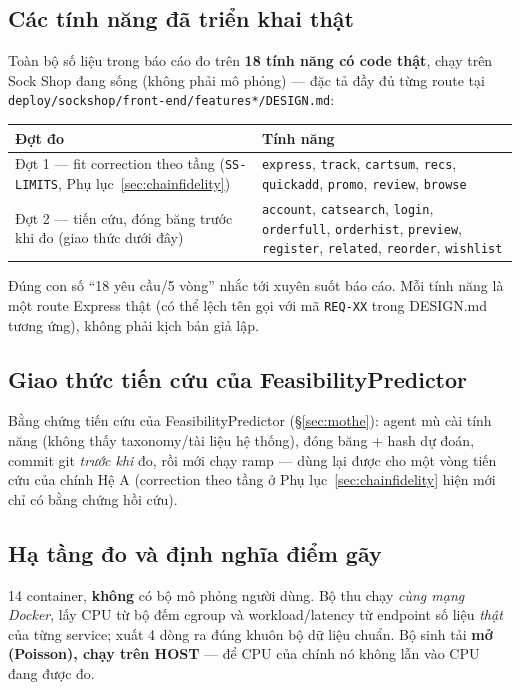 \documentclass[11pt,a4paper]{article}
\begin{document}
\subsection*{Các tính năng đã triển khai thật}\label{sec:tinhnangdatrienkhai}
Toàn bộ số liệu trong báo cáo đo trên \textbf{18 tính năng có code thật}, chạy
trên Sock Shop đang sống (không phải mô phỏng) --- đặc tả đầy đủ từng route tại
\texttt{deploy/sockshop/front-end/features*/DESIGN.md}:
\begin{center}\small
\begin{tabular}{p{7.6cm}p{5.4cm}}
\toprule Đợt đo & Tính năng \\ \midrule
Đợt 1 --- fit correction theo tầng (\texttt{SS-LIMITS}, Phụ lục~\ref{sec:chainfidelity}) &
  \texttt{express}, \texttt{track}, \texttt{cartsum}, \texttt{recs},
  \texttt{quickadd}, \texttt{promo}, \texttt{review}, \texttt{browse} \\
Đợt 2 --- tiến cứu, đóng băng trước khi đo (giao thức dưới đây) &
  \texttt{account}, \texttt{catsearch}, \texttt{login}, \texttt{orderfull},
  \texttt{orderhist}, \texttt{preview}, \texttt{register}, \texttt{related},
  \texttt{reorder}, \texttt{wishlist} \\ \bottomrule
\end{tabular}\end{center}
Đúng con số ``18 yêu cầu/5 vòng'' nhắc tới xuyên suốt báo cáo. Mỗi tính năng là
một route Express thật (có thể lệch tên gọi với mã \texttt{REQ-XX} trong
DESIGN.md tương ứng), không phải kịch bản giả lập.

\subsection*{Giao thức tiến cứu của FeasibilityPredictor}\label{sec:giaothuctiencuu}
Bằng chứng tiến cứu của FeasibilityPredictor (§\ref{sec:mothe}): agent mù cài
tính năng (không thấy taxonomy/tài liệu hệ thống), đóng băng + hash dự đoán,
commit git \emph{trước khi} đo, rồi mới chạy ramp --- dùng lại được cho một vòng
tiến cứu của chính Hệ A (correction theo tầng ở Phụ lục~\ref{sec:chainfidelity}
hiện mới chỉ có bằng chứng hồi cứu).

\subsection*{Hạ tầng đo và định nghĩa điểm gãy}\label{sec:donghohoa}
14 container, \textbf{không} có bộ mô phỏng người dùng. Bộ thu chạy \emph{cùng
mạng Docker}, lấy CPU từ bộ đếm cgroup và workload/latency từ endpoint số liệu
\emph{thật} của từng service; xuất 4 dòng ra đúng khuôn bộ dữ liệu chuẩn. Bộ sinh
tải \textbf{mở (Poisson), chạy trên HOST} --- để CPU của chính nó không lẫn vào
CPU đang được đo.
\end{document}
